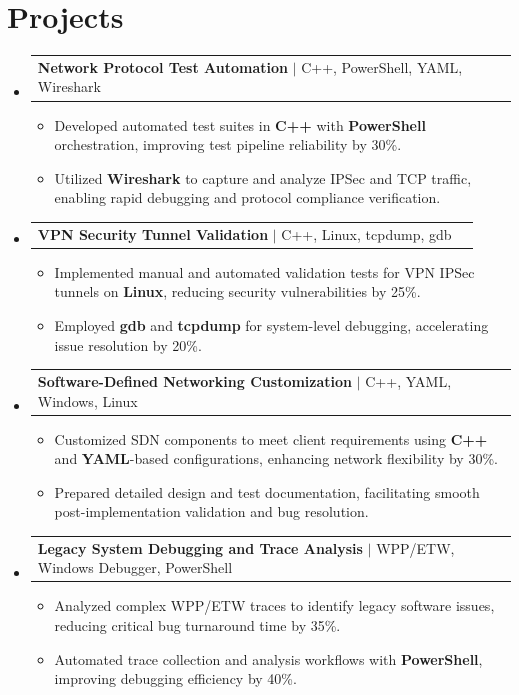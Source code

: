 \documentclass[letterpaper,11pt]{article}
\makeatletter
\newcommand{\resumeItem}[1]{
  \item\footnotesize{
    {#1 \vspace{-2pt}}
  }
}
\newcommand{\resumeProjectHeading}[2]{
    \item
    \begin{tabular*}{1.001\textwidth}{l@{\extracolsep{\fill}}r}
      \small#1 & \textbf{\small #2}\\
    \end{tabular*}\vspace{-7pt}
}
\newcommand{\resumeSubHeadingListStart}{\begin{itemize}[leftmargin=0pt, label={}]}
\newcommand{\resumeSubHeadingListEnd}{\end{itemize}}
\newcommand{\resumeItemListStart}{\begin{itemize}[leftmargin=*]}
\newcommand{\resumeItemListEnd}{\end{itemize}\vspace{-5pt}}
\makeatother
\begin{document}
\section{Projects}
    \vspace{-5pt}
    \resumeSubHeadingListStart

      \resumeProjectHeading
          {\textbf{Network Protocol Test Automation} $|$ C++, PowerShell, YAML, Wireshark}{ }
        \resumeItemListStart
            \resumeItem{Developed automated test suites in \textbf{C++} with \textbf{PowerShell} orchestration, improving test pipeline reliability by 30\%.}
            \resumeItem{Utilized \textbf{Wireshark} to capture and analyze IPSec and TCP traffic, enabling rapid debugging and protocol compliance verification.}
        \resumeItemListEnd
        \vspace{-12pt}

      \resumeProjectHeading
          {\textbf{VPN Security Tunnel Validation} $|$ C++, Linux, tcpdump, gdb}{ }
        \resumeItemListStart
            \resumeItem{Implemented manual and automated validation tests for VPN IPSec tunnels on \textbf{Linux}, reducing security vulnerabilities by 25\%.}
            \resumeItem{Employed \textbf{gdb} and \textbf{tcpdump} for system-level debugging, accelerating issue resolution by 20\%.}
        \resumeItemListEnd
        \vspace{-12pt}

      \resumeProjectHeading
          {\textbf{Software-Defined Networking Customization} $|$ C++, YAML, Windows, Linux}{ }
        \resumeItemListStart
            \resumeItem{Customized SDN components to meet client requirements using \textbf{C++} and \textbf{YAML}-based configurations, enhancing network flexibility by 30\%.}
            \resumeItem{Prepared detailed design and test documentation, facilitating smooth post-implementation validation and bug resolution.}
        \resumeItemListEnd
        \vspace{-12pt}

      \resumeProjectHeading
          {\textbf{Legacy System Debugging and Trace Analysis} $|$ WPP/ETW, Windows Debugger, PowerShell}{ }
        \resumeItemListStart
            \resumeItem{Analyzed complex WPP/ETW traces to identify legacy software issues, reducing critical bug turnaround time by 35\%.}
            \resumeItem{Automated trace collection and analysis workflows with \textbf{PowerShell}, improving debugging efficiency by 40\%.}
        \resumeItemListEnd

    \resumeSubHeadingListEnd
\end{document}
